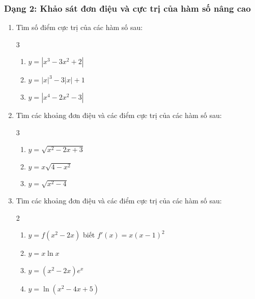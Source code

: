 \documentclass[12pt]{article}
\begin{document}
	\subsubsection{Dạng 2: Khảo sát đơn điệu và cực trị của hàm số nâng cao}
	
	\begin{btxanh}
		
		\begin{enumerate}[label=\textbf{Bài \arabic*.}]
			\item Tìm số điểm cực trị của các hàm số sau:
			\begin{multicols}{3}
				\begin{enumerate}[label=\alph*)]
					\item $y = |x^3 - 3x^2 + 2|$
					\item $y = |x|^3 - 3|x| + 1$
					\item $y = |x^4 - 2x^2 - 3|$
				\end{enumerate}
			\end{multicols}
			
			\item Tìm các khoảng đơn điệu và các điểm cực trị của các hàm số sau:
			\begin{multicols}{3}
				\begin{enumerate}[label=\alph*)]
					\item $y = \sqrt{x^2 - 2x + 3}$
					\item $y = x\sqrt{4 - x^2}$
					\item $y = \sqrt{x^2 - 4}$
				\end{enumerate}
			\end{multicols}
			
			\item  Tìm các khoảng đơn điệu và các điểm cực trị của các hàm số sau:
			\begin{multicols}{2}
				\begin{enumerate}[label=\alph*)]
					\item $y = f(x^2 - 2x)$ biết $f'(x) = x(x - 1)^2$
					\item $y = x \ln x$
					\item $y = (x^2 - 2x)e^x$
					\item $y = \ln(x^2 - 4x + 5)$
				\end{enumerate}
			\end{multicols}
		\end{enumerate}
	\end{btxanh}
	
\end{document}
